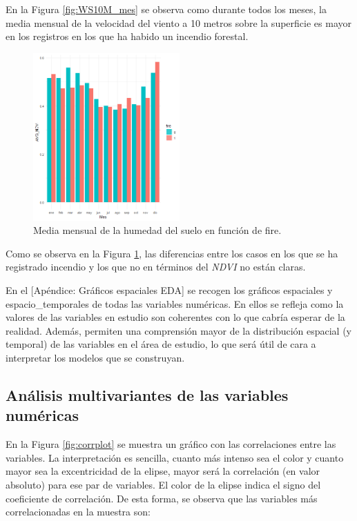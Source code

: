 \documentclass[12pt,a4paper,]{book}
\numberwithin{dummy}{section}
\theoremstyle{ocrenumbox}
\theoremstyle{blacknumex}
\theoremstyle{blacknumbox}
\theoremstyle{ocrenum}
\theoremstyle{ocrenum}
\begin{document}
En la Figura \ref{fig:WS10M_mes} se observa como durante todos los
meses, la media mensual de la velocidad del viento a 10 metros sobre la
superficie es mayor en los registros en los que ha habido un incendio
forestal.

\begin{figure}[H]
\centering
\includegraphics[width = 0.5\textwidth]{graficos/NDVI_mes.png}
\caption{Media mensual de la humedad del suelo en función de fire.}
\label{fig:NDVI_mes}
\end{figure}

Como se observa en la Figura \ref{fig:NDVI_mes}, las diferencias entre
los casos en los que se ha registrado incendio y los que no en términos
del \emph{NDVI} no están claras.

En el {[}Apéndice: Gráficos espaciales EDA{]} se recogen los gráficos
espaciales y espacio\_temporales de todas las variables numéricas. En
ellos se refleja como la valores de las variables en estudio son
coherentes con lo que cabría esperar de la realidad. Además, permiten
una comprensión mayor de la distribución espacial (y temporal) de las
variables en el área de estudio, lo que será útil de cara a interpretar
los modelos que se construyan.

\hypertarget{anuxe1lisis-multivariantes-de-las-variables-numuxe9ricas}{%
\subsection{Análisis multivariantes de las variables
numéricas}\label{anuxe1lisis-multivariantes-de-las-variables-numuxe9ricas}}

En la Figura \ref{fig:corrplot} se muestra un gráfico con las
correlaciones entre las variables. La interpretación es sencilla, cuanto
más intenso sea el color y cuanto mayor sea la excentricidad de la
elipse, mayor será la correlación (en valor absoluto) para ese par de
variables. El color de la elipse indica el signo del coeficiente de
correlación. De esta forma, se observa que las variables más
correlacionadas en la muestra son:
\end{document}
